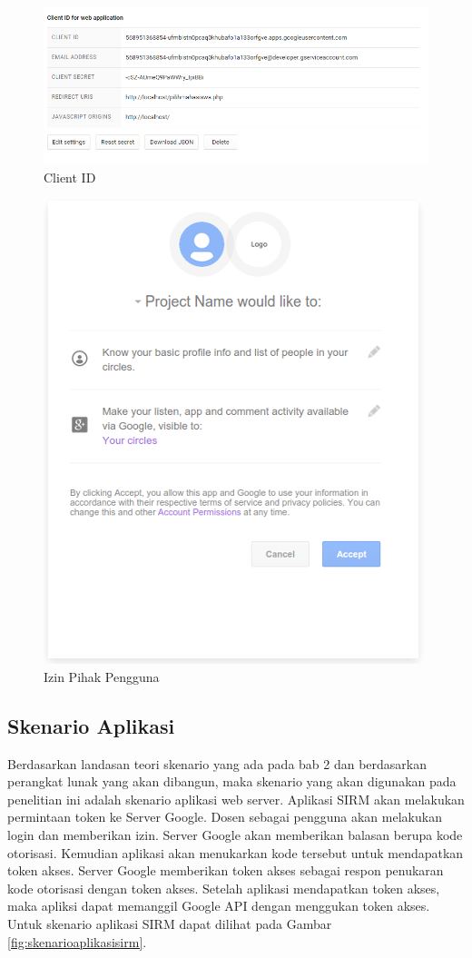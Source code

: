 \begin{figure}[H]
\centering
\includegraphics[scale=1]{Gambar/clientid.png}
\caption[Client ID]{Client ID} 
\label{fig:clientid}
\end{figure}

\begin{figure}[H]
\centering
\includegraphics[scale=1]{Gambar/izinpengguna.png}
\caption[Izin Pihak Pengguna]{Izin Pihak Pengguna} 
\label{fig:izinpengguna}
\end{figure}

\subsection{Skenario Aplikasi}
Berdasarkan landasan teori skenario yang ada pada bab 2 dan berdasarkan perangkat lunak yang akan dibangun, maka skenario yang akan digunakan pada penelitian ini adalah skenario aplikasi web server. Aplikasi SIRM akan melakukan permintaan token ke Server Google. Dosen sebagai pengguna akan melakukan login dan memberikan izin. Server Google akan memberikan balasan berupa kode otorisasi. Kemudian aplikasi akan menukarkan kode tersebut untuk mendapatkan token akses. Server Google memberikan token akses sebagai respon penukaran kode otorisasi dengan token akses. Setelah aplikasi mendapatkan token akses, maka apliksi dapat memanggil Google API dengan menggukan token akses. Untuk skenario aplikasi SIRM dapat dilihat pada Gambar \ref{fig:skenarioaplikasisirm}.

